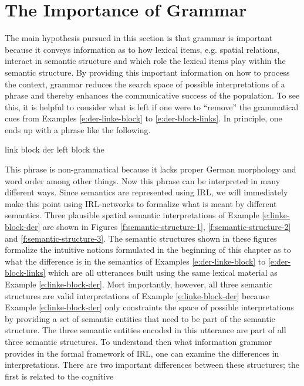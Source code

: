 \section{The Importance of Grammar}
The main hypothesis pursued in this section is that grammar is important because it 
conveys information as to how lexical items, e.g. spatial relations, interact in semantic structure
and which role the lexical items play within the semantic structure. 
By providing this important information on how to process the context,
grammar reduces the search space of possible interpretations of a phrase and 
thereby enhances the communicative success of the population.
To see this, it is helpful to consider what is left if one were to ``remove'' the 
grammatical cues from Examples \ref{e:der-linke-block} to \ref{e:der-block-links}.
In principle, one ends up with a phrase like the following.
\begin{example}
\label{e:linke-block-der}
\gll link block der
left block the
\glt
\glend
\end{example}
This phrase is non-grammatical because it lacks proper German morphology
and word order among other things. Now this phrase can 
be interpreted in many different ways. 
Since semantics are represented using IRL, we
will immediately make this point using IRL-networks 
to formalize what is meant by different 
semantics. Three plausible spatial semantic interpretations 
of Example \ref{e:linke-block-der} are 
shown in Figures \ref{f:semantic-structure-1}, 
\ref{f:semantic-structure-2} and \ref{f:semantic-structure-3}.
The semantic structures shown in these figures formalize 
the intuitive notions formulated
in the beginning of this chapter as to what the difference is in 
the semantics of Examples \ref{e:der-linke-block} to \ref{e:der-block-links}
which are all utterances built using the same lexical material as Example \ref{e:linke-block-der}.
Mort importantly, however, all three semantic structures are valid interpretations of 
Example \ref{e:linke-block-der} because Example  \ref{e:linke-block-der} 
only constraints the space of possible interpretations by providing
a set of semantic entities that need to be part of the semantic structure. The three 
semantic entities encoded in this utterance are part of all three semantic structures. 
To understand then what information grammar
provides in the formal framework of IRL, 
one can examine the differences in interpretations. 
There are two important differences 
between these structures; the first is related to the cognitive
